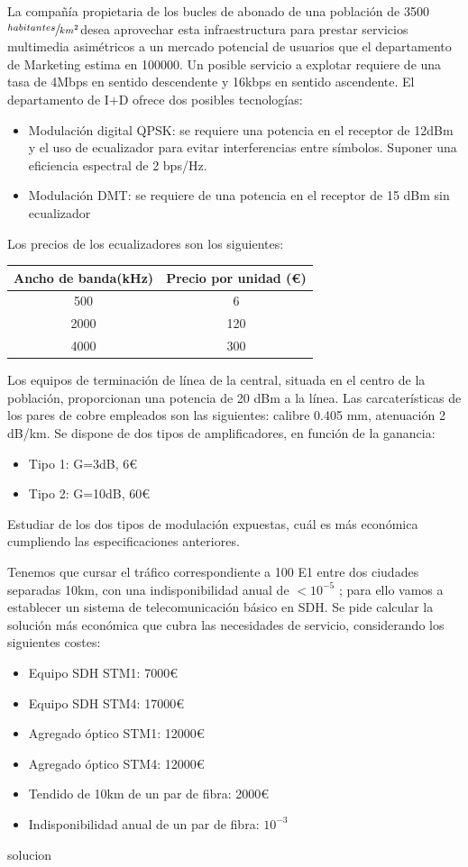 \begin{exercise}[3]
La compañía propietaria de los bucles de abonado de una población de 3500$\sfrac{habitantes}{km^2}$desea aprovechar esta infraestructura para prestar servicios multimedia asimétricos a un mercado potencial de usuarios que el departamento de Marketing estima en 100000. Un posible servicio a explotar requiere de una tasa de 4Mbps en sentido descendente y 16kbps en sentido ascendente. El departamento de I+D ofrece dos posibles tecnologías:
\begin{itemize}
	\item Modulación digital QPSK: se requiere una potencia en el receptor de 12dBm y el uso de ecualizador para evitar interferencias entre símbolos. Suponer una eficiencia espectral de 2 bps/Hz.
	\item Modulación DMT: se requiere de una potencia en el receptor de 15 dBm sin ecualizador
\end{itemize}
Los precios de los ecualizadores son los siguientes:
\begin{center}
\begin{tabular}{|c c|}
\hline
	Ancho de banda(kHz) & Precio por unidad (€)\\\hline
	500 & 6\\\hline
	2000 & 120\\\hline
	4000 & 300\\\hline
\end{tabular}
\end{center}
Los equipos de terminación de línea de la central, situada en el centro de la población, proporcionan una potencia de 20 dBm a la línea. Las carcaterísticas de los pares de cobre empleados son las siguientes: calibre 0.405 mm, atenuación 2 dB/km. Se dispone de dos tipos de amplificadores, en función de la ganancia:
\begin{itemize}
	\item Tipo 1: G=3dB, 6€
	\item Tipo 2: G=10dB, 60€
\end{itemize}
Estudiar de los dos tipos de modulación expuestas, cuál es más económica cumpliendo las especificaciones anteriores.
\end{exercise}
\begin{exercise}[4]
	Tenemos que cursar el tráfico correspondiente a 100 E1 entre dos ciudades separadas 10km, con una indisponibilidad anual de $<10^{-5}$ ; para ello vamos a establecer un sistema de telecomunicación básico en SDH. Se pide calcular la solución más económica que cubra las necesidades de servicio, considerando los siguientes costes:
\begin{itemize}
	\item Equipo SDH STM1: 7000€
	\item Equipo SDH STM4: 17000€
	\item Agregado óptico STM1: 12000€
	\item Agregado óptico STM4: 12000€
	\item Tendido de 10km de un par de fibra: 2000€
	\item Indisponibilidad anual de un par de fibra: $10^{-3}$
\end{itemize}
solucion
\end{exercise}
